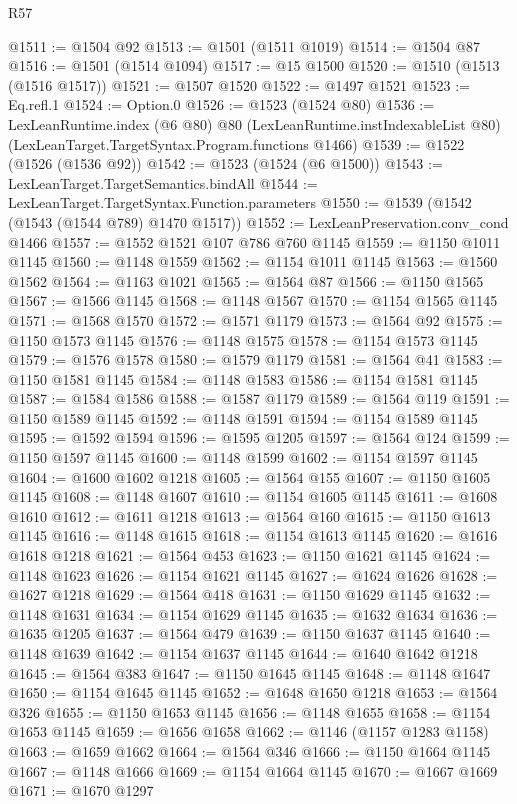 \begin{lexlean}{R57}
\begin{coremodule}
@1511 := @1504 @92
@1513 := @1501 (@1511 @1019)
@1514 := @1504 @87
@1516 := @1501 (@1514 @1094)
@1517 := @15 @1500
@1520 := @1510 (@1513 (@1516 @1517))
@1521 := @1507 @1520
@1522 := @1497 @1521
@1523 := Eq.refl.{1}
@1524 := Option.{0}
@1526 := @1523 (@1524 @80)
@1536 := LexLeanRuntime.index
    (@6 @80)
    @80
    (LexLeanRuntime.instIndexableList @80)
    (LexLeanTarget.TargetSyntax.Program.functions @1466)
@1539 := @1522 (@1526 (@1536 @92))
@1542 := @1523 (@1524 (@6 @1500))
@1543 := LexLeanTarget.TargetSemantics.bindAll
@1544 := LexLeanTarget.TargetSyntax.Function.parameters
@1550 := @1539 (@1542 (@1543 (@1544 @789) @1470 @1517))
@1552 := LexLeanPreservation.conv_cond @1466
@1557 := @1552 @1521 @107 @786 @760 @1145
@1559 := @1150 @1011 @1145
@1560 := @1148 @1559
@1562 := @1154 @1011 @1145
@1563 := @1560 @1562
@1564 := @1163 @1021
@1565 := @1564 @87
@1566 := @1150 @1565
@1567 := @1566 @1145
@1568 := @1148 @1567
@1570 := @1154 @1565 @1145
@1571 := @1568 @1570
@1572 := @1571 @1179
@1573 := @1564 @92
@1575 := @1150 @1573 @1145
@1576 := @1148 @1575
@1578 := @1154 @1573 @1145
@1579 := @1576 @1578
@1580 := @1579 @1179
@1581 := @1564 @41
@1583 := @1150 @1581 @1145
@1584 := @1148 @1583
@1586 := @1154 @1581 @1145
@1587 := @1584 @1586
@1588 := @1587 @1179
@1589 := @1564 @119
@1591 := @1150 @1589 @1145
@1592 := @1148 @1591
@1594 := @1154 @1589 @1145
@1595 := @1592 @1594
@1596 := @1595 @1205
@1597 := @1564 @124
@1599 := @1150 @1597 @1145
@1600 := @1148 @1599
@1602 := @1154 @1597 @1145
@1604 := @1600 @1602 @1218
@1605 := @1564 @155
@1607 := @1150 @1605 @1145
@1608 := @1148 @1607
@1610 := @1154 @1605 @1145
@1611 := @1608 @1610
@1612 := @1611 @1218
@1613 := @1564 @160
@1615 := @1150 @1613 @1145
@1616 := @1148 @1615
@1618 := @1154 @1613 @1145
@1620 := @1616 @1618 @1218
@1621 := @1564 @453
@1623 := @1150 @1621 @1145
@1624 := @1148 @1623
@1626 := @1154 @1621 @1145
@1627 := @1624 @1626
@1628 := @1627 @1218
@1629 := @1564 @418
@1631 := @1150 @1629 @1145
@1632 := @1148 @1631
@1634 := @1154 @1629 @1145
@1635 := @1632 @1634
@1636 := @1635 @1205
@1637 := @1564 @479
@1639 := @1150 @1637 @1145
@1640 := @1148 @1639
@1642 := @1154 @1637 @1145
@1644 := @1640 @1642 @1218
@1645 := @1564 @383
@1647 := @1150 @1645 @1145
@1648 := @1148 @1647
@1650 := @1154 @1645 @1145
@1652 := @1648 @1650 @1218
@1653 := @1564 @326
@1655 := @1150 @1653 @1145
@1656 := @1148 @1655
@1658 := @1154 @1653 @1145
@1659 := @1656 @1658
@1662 := @1146 (@1157 @1283 @1158)
@1663 := @1659 @1662
@1664 := @1564 @346
@1666 := @1150 @1664 @1145
@1667 := @1148 @1666
@1669 := @1154 @1664 @1145
@1670 := @1667 @1669
@1671 := @1670 @1297

\end{coremodule}
\end{lexlean}
